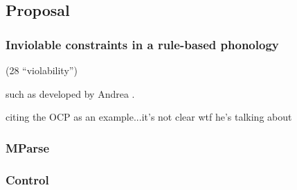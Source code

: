 \subsection{Proposal}

\citet{OT}
\citet{Orgun1999}

\subsubsection{Inviolable constraints in a rule-based phonology}

\citet{Vaux2008}
(28 ``violability'')

such as developed by Andrea \citet{Calabrese1995,Calabrese2005}. 

citing the OCP as an example...it's not clear wtf he's talking about
\citet{Goldsmith1976}

\citet{Nevins2003} %
\citet{Rice2007} %

\citet[][9f.]{Baerman2010b}
\citet[][437]{Heath2005}

\citet{OT}
\citet{Orgun1999}

\subsubsection{MParse}

\citet{OT}
\citet{Raffelsiefen1999}
\citet{Raffelsiefen2004}

\citet{Wolf2009}

\subsubsection{Control}

\citet{Orgun1999}
\citet{Orgun2009}
